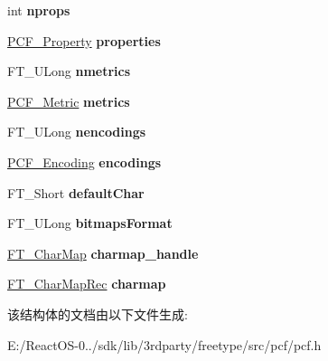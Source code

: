 \begin{DoxyCompactItemize}
int {\bfseries nprops}
\item 
\mbox{\label{struct_p_c_f___face_rec___af9d68a587f4d07fe5c8782a1edf47faa}} 
\hyperlink{struct_p_c_f___property_rec__}{P\+C\+F\+\_\+\+Property} {\bfseries properties}
\item 
\mbox{\label{struct_p_c_f___face_rec___a6ddfde021b6866cf9c12eb881bc6b29c}} 
F\+T\+\_\+\+U\+Long {\bfseries nmetrics}
\item 
\mbox{\label{struct_p_c_f___face_rec___abf1b0ff1a51b11de47000f7f34b5f8bf}} 
\hyperlink{struct_p_c_f___metric_rec__}{P\+C\+F\+\_\+\+Metric} {\bfseries metrics}
\item 
\mbox{\label{struct_p_c_f___face_rec___a5f215281a96aec84ea77f976c0fca92e}} 
F\+T\+\_\+\+U\+Long {\bfseries nencodings}
\item 
\mbox{\label{struct_p_c_f___face_rec___ae22d68a972fbdda6ce79569d373d3d2d}} 
\hyperlink{struct_p_c_f___encoding_rec__}{P\+C\+F\+\_\+\+Encoding} {\bfseries encodings}
\item 
\mbox{\label{struct_p_c_f___face_rec___a3251bb495b2c1dec4eddcf8e29413555}} 
F\+T\+\_\+\+Short {\bfseries default\+Char}
\item 
\mbox{\label{struct_p_c_f___face_rec___af1331f54c25d919b0a5949f829f5407e}} 
F\+T\+\_\+\+U\+Long {\bfseries bitmaps\+Format}
\item 
\mbox{\label{struct_p_c_f___face_rec___a06d9b5fe1a219df68d66ee68232db271}} 
\hyperlink{struct_f_t___char_map_rec__}{F\+T\+\_\+\+Char\+Map} {\bfseries charmap\+\_\+handle}
\item 
\mbox{\label{struct_p_c_f___face_rec___a9cee8b94fd0fff40b65301c29ab46e28}} 
\hyperlink{struct_f_t___char_map_rec__}{F\+T\+\_\+\+Char\+Map\+Rec} {\bfseries charmap}
\end{DoxyCompactItemize}


该结构体的文档由以下文件生成\+:\begin{DoxyCompactItemize}
\item 
E\+:/\+React\+O\+S-\/0../sdk/lib/3rdparty/freetype/src/pcf/pcf.\+h\end{DoxyCompactItemize}
